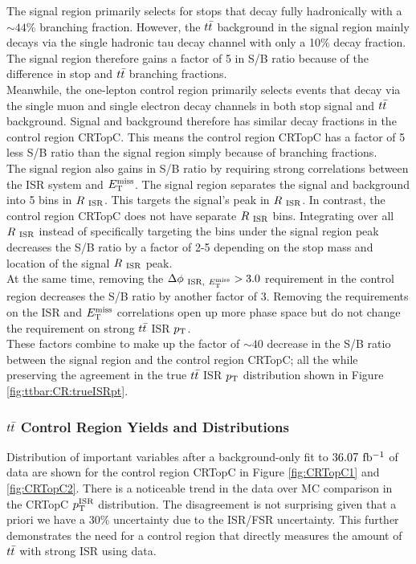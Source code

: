 \indent The signal region primarily selects for stops that decay fully hadronically with a $\sim44$\% branching fraction.  However, the $t\bar{t}$ background in the signal region mainly decays via the single hadronic tau decay channel with only a 10\% decay fraction.  The signal region therefore gains a factor of 5 in S/B ratio because of the difference in stop and $t\bar{t}$ branching fractions.    \\

\indent Meanwhile, the one-lepton control region primarily selects events that decay via the single muon and single electron decay channels in both stop signal and $t\bar{t}$ background.  Signal and background therefore has similar decay fractions in the control region CRTopC.  This means the control region CRTopC has a factor of 5 less S/B ratio than the signal region simply because of branching fractions.  \\

\indent The signal region also gains in S/B ratio by requiring strong correlations between the ISR system and $E_{\mathrm{T}}^{\mathrm{miss}}$.  The signal region separates the signal and background into 5 bins in $R_{~\mathrm{ISR}}$.  This targets the signal's peak in $R_{~\mathrm{ISR}}$.  In contrast, the control region CRTopC does not have separate $R_{~\mathrm{ISR}}$ bins.  Integrating over all $R_{~\mathrm{ISR}}$ instead of specifically targeting the bins under the signal region peak decreases the S/B ratio by a factor of 2-5 depending on the stop mass and location of the signal $R_{~\mathrm{ISR}}$ peak.  \\

\indent At the same time, removing the $\Delta\phi_{~\mathrm{ISR},~E_{\mathrm{T}}^{\mathrm{miss}}} > 3.0$ requirement in the control region decreases the S/B ratio by another factor of 3.  Removing the requirements on the ISR and $E_{\mathrm{T}}^{\mathrm{miss}}$ correlations open up more phase space but do not change the requirement on strong $t\bar{t}$ ISR $p_{\mathrm{T}}$.  \\

\indent These factors combine to make up the factor of $\sim40$ decrease in the S/B ratio between the signal region and the control region CRTopC; all the while preserving the agreement in the true $t\bar{t}$ ISR $p_{\mathrm{T}}$ distribution shown in Figure \ref{fig:ttbar:CR:trueISRpt}. \\

\subsubsection{$t\bar{t}$ Control Region Yields and Distributions}

\indent Distribution of important variables after a background-only fit to $36.07$ $\mbox{fb$^{-1}$}$ of data are shown for the control region CRTopC in Figure \ref{fig:CRTopC1} and \ref{fig:CRTopC2}.   There is a noticeable trend in the data over MC comparison in the CRTopC $p_{\mathrm{T}}^{\mathrm{ISR}}$ distribution.  The disagreement is not surprising given that a priori we have a 30\% uncertainty due to the ISR/FSR uncertainty.  This further demonstrates the need for a control region that directly measures the amount of $t\bar{t}$ with strong ISR using data. \\

